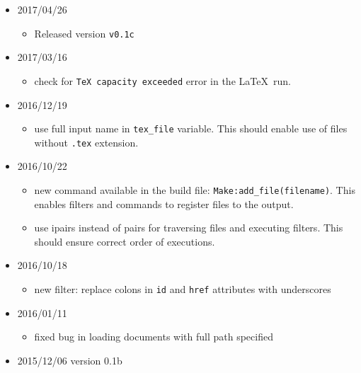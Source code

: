 \begin{itemize}
  \begin{itemize}
  \tightlist
  \item
    fixed the command line option parsing for \texttt{tex4ht},
    \texttt{t4ht} and \texttt{latex} commands
  \item
    various grammar and factual fixes in the documentation
  \end{itemize}
\item
  2017/04/26

  \begin{itemize}
  \tightlist
  \item
    Released version \texttt{v0.1c}
  \end{itemize}
\item
  2017/03/16

  \begin{itemize}
  \tightlist
  \item
    check for \texttt{TeX\ capacity\ exceeded} error in the \LaTeX~run.
  \end{itemize}
\item
  2016/12/19

  \begin{itemize}
  \tightlist
  \item
    use full input name in \texttt{tex\_file} variable. This should
    enable use of files without \texttt{.tex} extension.
  \end{itemize}
\item
  2016/10/22

  \begin{itemize}
  \tightlist
  \item
    new command available in the build file:
    \texttt{Make:add\_file(filename)}. This enables filters and commands
    to register files to the output.
  \item
    use ipairs instead of pairs for traversing files and executing
    filters. This should ensure correct order of executions.
  \end{itemize}
\item
  2016/10/18

  \begin{itemize}
  \tightlist
  \item
    new filter: replace colons in \texttt{id} and \texttt{href}
    attributes with underscores
  \end{itemize}
\item
  2016/01/11

  \begin{itemize}
  \tightlist
  \item
    fixed bug in loading documents with full path specified
  \end{itemize}
\item
  2015/12/06 version 0.1b


\end{itemize}
